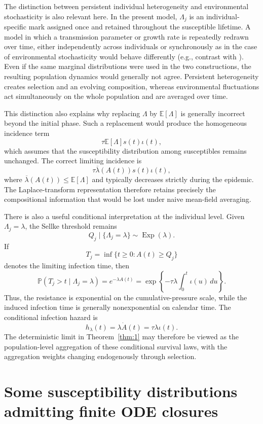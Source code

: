 \documentclass[pdflatex,sn-mathphys-ay]{sn-jnl}
\theoremstyle{thmstyleone}
\theoremstyle{thmstyletwo}
\theoremstyle{thmstylethree}
\newcommand{\E}{\mathbb{E}}
\newcommand{\Pp}{\mathbb{P}}
\begin{document}
The distinction between persistent individual heterogeneity and environmental
stochasticity is also relevant here.
In the present
model, \(\Lambda_j\) is an individual-specific mark assigned once and retained
throughout the susceptible lifetime. A model in which a transmission parameter or
growth rate is repeatedly redrawn over time, either independently across individuals or synchronously as in the case of environmental stochasticity would behave differently (e.g., contrast \cite{mackenzie2025impact} with \cite{Gillespie1973}). Even if the same marginal distributions were used
in the two constructions, the resulting population dynamics would generally
not agree. Persistent heterogeneity creates selection and an evolving
composition, whereas environmental fluctuations act simultaneously on the
whole population and are averaged over time.

This distinction also explains why replacing \(\Lambda\) by
\(\E[\Lambda]\) is generally incorrect beyond the initial phase. Such a
replacement would produce the homogeneous incidence term
\[
\tau\E[\Lambda]s(t)\iota(t),
\]
which assumes that the susceptibility distribution among susceptibles remains
unchanged. The correct limiting incidence is
\[
\tau\overline{\lambda}(A(t))s(t)\iota(t),
\]
where \(\overline{\lambda}(A(t))\leq \E[\Lambda]\) and typically decreases
strictly during the epidemic. The Laplace-transform representation therefore
retains precisely the compositional information that would be lost under
naive mean-field averaging.

There is also a useful conditional interpretation at the individual level.
Given \(\Lambda_j=\lambda\), the Sellke threshold remains
\[
Q_j\mid\{\Lambda_j=\lambda\}\sim\operatorname{Exp}(\lambda).
\]
If
\[
T_j=\inf\{t\geq0:A(t)\geq Q_j\}
\]
denotes the limiting infection time, then
\[
\Pp(T_j>t\mid\Lambda_j=\lambda)
=
e^{-\lambda A(t)}
=
\exp\left\{
-\tau\lambda\int_0^t\iota(u)\,du
\right\}.
\]
Thus, the resistance is exponential on the cumulative-pressure scale, while
the induced infection time is generally nonexponential on calendar time. The
conditional infection hazard is
\[
h_\lambda(t)=\lambda\dot A(t)=\tau\lambda\iota(t).
\]
The deterministic limit in Theorem~\ref{thm:1}  may therefore be viewed as the population-level
aggregation of these conditional survival laws, with the aggregation weights
changing endogenously through selection.




\section{Some susceptibility distributions admitting finite ODE closures}\label{sec:examples}
 
\end{document}
